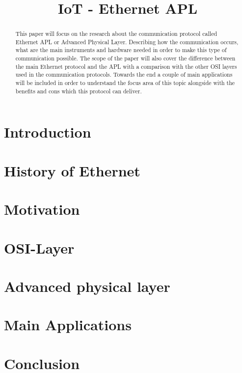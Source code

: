 \documentclass[conference]{IEEEtran}
\begin{document}
\title{IoT - Ethernet APL\\
}

\author{

}

\maketitle

\begin{abstract}
This paper will focus on the research about the communication protocol called Ethernet APL or Advanced Physical Layer. Describing how the communication occurs, what are the main instruments and hardware needed in order to make this type of communication possible. The scope of the paper will also cover the difference between the main Ethernet protocol and the APL with a comparison with the other OSI layers used in the communication protocols. Towards the end a couple of main applications will be included in order to understand the focus area of this topic alongside with the benefits and cons which this protocol can deliver.
 
\end{abstract}

\begin{IEEEkeywords}

\end{IEEEkeywords}

\section{Introduction}



\section{History of Ethernet}

\section{Motivation}


\section{OSI-Layer}

\section{Advanced physical layer}

\section{Main Applications}

\section{Conclusion}




\begin{thebibliography}{00}
\end{thebibliography}
\end{document}
